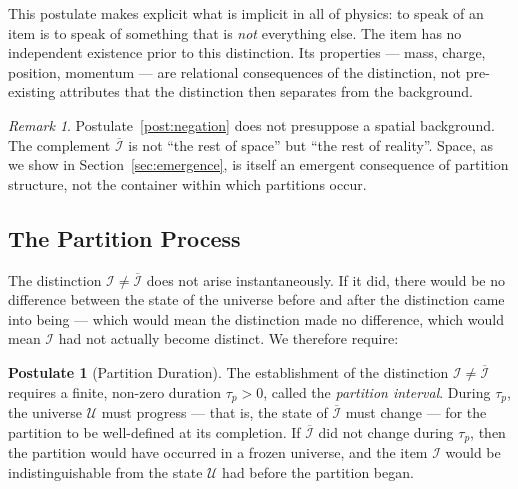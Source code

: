 \documentclass[11pt,twocolumn,a4paper]{article}
\theoremstyle{plain}
\theoremstyle{definition}
\newtheorem{postulate}[theorem]{Postulate}
\theoremstyle{remark}
\newtheorem{remark}[theorem]{Remark}
\begin{document}
This postulate makes explicit what is implicit in all of physics: to speak of an
item is to speak of something that is \emph{not} everything else. The item has no
independent existence prior to this distinction. Its properties --- mass, charge,
position, momentum --- are relational consequences of the distinction, not
pre-existing attributes that the distinction then separates from the background.

\begin{remark}
Postulate~\ref{post:negation} does not presuppose a spatial background. The
complement $\overline{\mathcal{I}}$ is not ``the rest of space'' but ``the rest
of reality''. Space, as we show in Section~\ref{sec:emergence}, is itself an
emergent consequence of partition structure, not the container within which
partitions occur.
\end{remark}

\subsection{The Partition Process}
\label{subsec:partition_process}

The distinction $\mathcal{I} \neq \overline{\mathcal{I}}$ does not arise
instantaneously. If it did, there would be no difference between the state of
the universe before and after the distinction came into being --- which would
mean the distinction made no difference, which would mean $\mathcal{I}$ had not
actually become distinct. We therefore require:

\begin{postulate}[Partition Duration]
\label{post:duration}
The establishment of the distinction $\mathcal{I} \neq \overline{\mathcal{I}}$
requires a finite, non-zero duration $\tau_p > 0$, called the
\emph{partition interval}. During $\tau_p$, the universe $\mathcal{U}$ must
progress --- that is, the state of $\overline{\mathcal{I}}$ must change --- for
the partition to be well-defined at its completion. If $\overline{\mathcal{I}}$
did not change during $\tau_p$, then the partition would have occurred in a
frozen universe, and the item $\mathcal{I}$ would be indistinguishable from the
state $\mathcal{U}$ had before the partition began.
\end{postulate}
\end{document}
